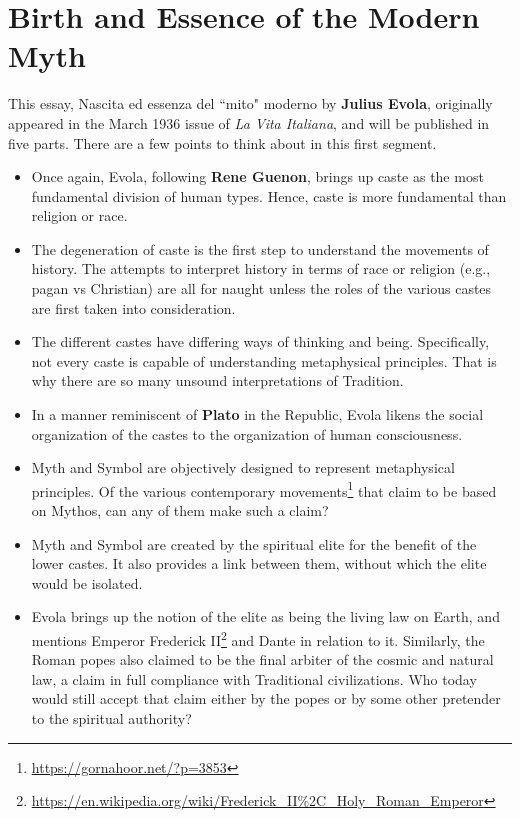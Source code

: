 \section{Birth and Essence of the Modern Myth}

\label{sec:BirthEssenceModernMyth}

\begin{quotex}
This essay, Nascita ed essenza del ``mito" moderno by \textbf{Julius Evola}, originally appeared in the March 1936 issue of \textit{La Vita Italiana}, and will be published in five parts. There are a few points to think about in this first segment.
\begin{itemize}
\item 
Once again, Evola, following \textbf{Rene Guenon}, brings up caste as the most fundamental division of human types. Hence, caste is more fundamental than religion or race. 

\item
The degeneration of caste is the first step to understand the movements of history. The attempts to interpret history in terms of race or religion (e.g., pagan vs Christian) are all for naught unless the roles of the various castes are first taken into consideration. 

\item
The different castes have differing ways of thinking and being. Specifically, not every caste is capable of understanding metaphysical principles. That is why there are so many unsound interpretations of Tradition. 

\item
In a manner reminiscent of \textbf{Plato} in the Republic, Evola likens the social organization of the castes to the organization of human consciousness. 

\item
Myth and Symbol are objectively designed to represent metaphysical principles. Of the various contemporary movements\footnote{\url{https://gornahoor.net/?p=3853}} that claim to be based on Mythos, can any of them make such a claim? 

\item
Myth and Symbol are created by the spiritual elite for the benefit of the lower castes. It also provides a link between them, without which the elite would be isolated. 

\item
Evola brings up the notion of the elite as being the living law on Earth, and mentions Emperor Frederick II\footnote{\url{https://en.wikipedia.org/wiki/Frederick_II\%2C_Holy_Roman_Emperor}} and Dante in relation to it. Similarly, the Roman popes also claimed to be the final arbiter of the cosmic and natural law, a claim in full compliance with Traditional civilizations. Who today would still accept that claim either by the popes or by some other pretender to the spiritual authority? 

\end{itemize}\end{quotex}
